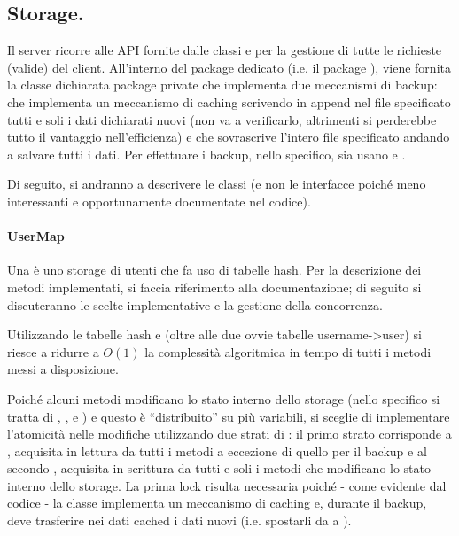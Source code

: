 \documentclass[11pt, italian, openany]{book}
\begin{document}
\begin{sloppypar}
\subsection{Storage.}
Il server ricorre alle API fornite dalle classi  e  per la gestione di tutte le richieste (valide)
del client. All'interno del package dedicato (i.e. il package ), viene fornita la classe dichiarata package
private  che implementa due meccanismi di backup:  che implementa un meccanismo di caching scrivendo
in append nel file specificato tutti e soli i dati dichiarati nuovi (non va a verificarlo, altrimenti si perderebbe tutto il vantaggio
nell'efficienza) e  che sovrascrive l'intero file specificato andando a salvare tutti i dati. Per effettuare i
backup, nello specifico, sia usano  e .

Di seguito, si andranno a descrivere le classi (e non le interfacce poich\'e meno interessanti e opportunamente documentate nel codice).
\paragraph*{UserMap}
Una  \`e uno storage di utenti che fa uso di tabelle hash. Per la descrizione dei metodi implementati, si faccia riferimento
alla documentazione; di seguito si discuteranno le scelte implementative e la gestione della concorrenza.

Utilizzando le tabelle hash  e  (oltre alle due ovvie tabelle username->user) si riesce a ridurre
a \(O(1)\) la complessit\`a algoritmica in tempo di tutti i metodi messi a disposizione.

Poich\'e alcuni metodi modificano lo stato
interno dello storage (nello specifico si tratta di , ,  e )
e questo \`e ``distribuito'' su pi\`u variabili, si sceglie di implementare l'atomicit\`a nelle modifiche
utilizzando due strati di : il primo strato corrisponde a , acquisita in lettura da tutti
i metodi a eccezione di quello per il backup e al secondo , acquisita in scrittura da tutti e soli i metodi che
modificano lo stato interno dello storage. La prima lock risulta necessaria poich\'e - come evidente dal codice - la classe implementa
un meccanismo di caching e, durante il backup, deve trasferire nei dati cached i dati nuovi (i.e. spostarli da 
a ).


\end{sloppypar}
\end{document}
